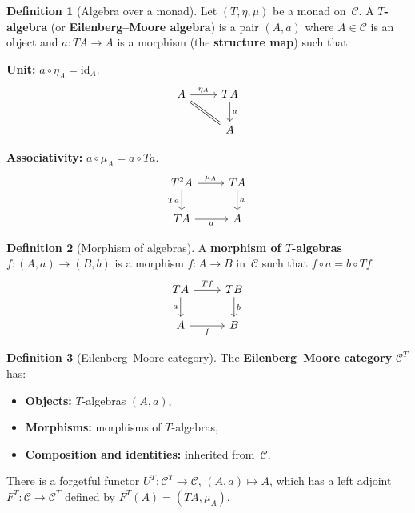 \documentclass[a4paper,12pt]{book}
\newcommand{\id}{\mathrm{id}}
\theoremstyle{definition}
\newtheorem{definition}{Definition}[section]
\theoremstyle{plain}
\theoremstyle{remark}
\begin{document}
\begin{definition}[Algebra over a monad]\label{def:em-algebra}
Let $(T,\eta,\mu)$ be a monad on~$\mathcal{C}$.
A \textbf{$T$-algebra} (or \textbf{Eilenberg--Moore algebra}) is a pair
$(A,a)$ where $A\in\mathcal{C}$ is an object and
$a\colon TA\to A$ is a morphism (the \textbf{structure map}) such that:

\textbf{Unit:}
$a\circ\eta_A = \id_A$.
\[
\begin{tikzcd}
A \arrow[r, "\eta_A"] \arrow[dr, equal] &
TA \arrow[d, "a"] \\
& A
\end{tikzcd}
\]

\textbf{Associativity:}
$a\circ\mu_A = a\circ Ta$.
\[
\begin{tikzcd}
T^2A \arrow[r, "\mu_A"] \arrow[d, "Ta"'] &
TA \arrow[d, "a"] \\
TA \arrow[r, "a"'] &
A
\end{tikzcd}
\]
\end{definition}

\begin{definition}[Morphism of algebras]\label{def:em-morphism}
A \textbf{morphism of $T$-algebras} $f\colon(A,a)\to(B,b)$ is a
morphism $f\colon A\to B$ in~$\mathcal{C}$ such that $f\circ a = b\circ Tf$:
\[
\begin{tikzcd}
TA \arrow[r, "Tf"] \arrow[d, "a"'] &
TB \arrow[d, "b"] \\
A \arrow[r, "f"'] &
B
\end{tikzcd}
\]
\end{definition}

\begin{definition}[Eilenberg--Moore category]\label{def:em-category}
The \textbf{Eilenberg--Moore category} $\mathcal{C}^T$ has:
\begin{itemize}
\item \textbf{Objects:} $T$-algebras $(A,a)$,
\item \textbf{Morphisms:} morphisms of $T$-algebras,
\item \textbf{Composition and identities:} inherited from~$\mathcal{C}$.
\end{itemize}
There is a forgetful functor $U^T\colon\mathcal{C}^T\to\mathcal{C}$,
$(A,a)\mapsto A$, which has a left adjoint
$F^T\colon\mathcal{C}\to\mathcal{C}^T$ defined by
$F^T(A) = (TA,\mu_A)$.
\end{definition}
\end{document}
